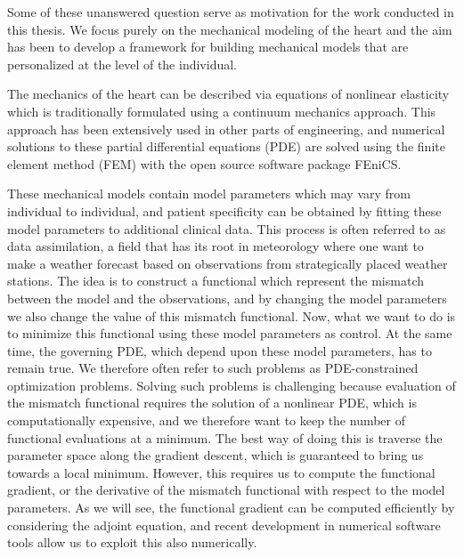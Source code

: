 
Some of these unanswered question serve as motivation for the work
conducted in this thesis. We focus purely on the mechanical modeling
of the heart and the aim has been to develop a framework for
building mechanical models that are personalized at the level of the
individual.

The mechanics of the heart can be described via equations of nonlinear
elasticity which is traditionally formulated using a continuum
mechanics approach. This approach has been extensively used in other
parts of engineering, and numerical solutions to these partial
differential equations (PDE) are solved using the finite element
method (FEM) with the open source software package FEniCS.

These mechanical models contain model parameters which may vary from
individual to individual, and patient specificity can be obtained by
fitting these model parameters to additional clinical data. This
process is often referred to as data assimilation, a field that has
its root in meteorology where one want to make a weather forecast based
on observations from strategically placed weather stations. The idea
is to construct a functional which represent the mismatch between the
model and the observations, and by changing the model parameters we
also change the value of this mismatch functional. Now, what we want to do is to
minimize this functional using these model parameters as control. At
the same time, the governing PDE, which depend upon these model
parameters, has to remain true. We therefore often
refer to such problems as PDE-constrained optimization problems.  
Solving such problems is challenging because evaluation of the
mismatch functional requires the solution of a nonlinear PDE, which is
computationally expensive, and we therefore want to keep the number of
functional evaluations at a minimum. The best way of doing this is
traverse the parameter space along the gradient descent, which is
guaranteed to bring us towards a local minimum. However, this requires
us to compute the functional gradient, or the derivative of the
mismatch functional with respect to the model parameters. As we will
see, the functional gradient can be computed efficiently by
considering the adjoint equation, and recent development in numerical
software tools \cite{farrell2013automated} allow us to exploit this
also numerically. 


